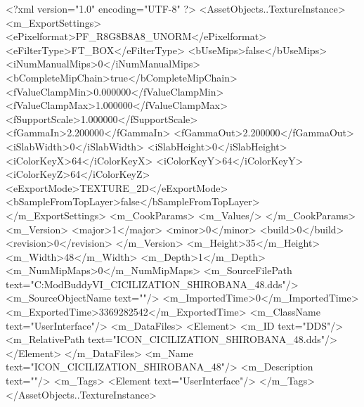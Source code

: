 <?xml version="1.0" encoding="UTF-8" ?>
<AssetObjects..TextureInstance>
	<m_ExportSettings>
		<ePixelformat>PF_R8G8B8A8_UNORM</ePixelformat>
		<eFilterType>FT_BOX</eFilterType>
		<bUseMips>false</bUseMips>
		<iNumManualMips>0</iNumManualMips>
		<bCompleteMipChain>true</bCompleteMipChain>
		<fValueClampMin>0.000000</fValueClampMin>
		<fValueClampMax>1.000000</fValueClampMax>
		<fSupportScale>1.000000</fSupportScale>
		<fGammaIn>2.200000</fGammaIn>
		<fGammaOut>2.200000</fGammaOut>
		<iSlabWidth>0</iSlabWidth>
		<iSlabHeight>0</iSlabHeight>
		<iColorKeyX>64</iColorKeyX>
		<iColorKeyY>64</iColorKeyY>
		<iColorKeyZ>64</iColorKeyZ>
		<eExportMode>TEXTURE_2D</eExportMode>
		<bSampleFromTopLayer>false</bSampleFromTopLayer>
	</m_ExportSettings>
	<m_CookParams>
		<m_Values/>
	</m_CookParams>
	<m_Version>
		<major>1</major>
		<minor>0</minor>
		<build>0</build>
		<revision>0</revision>
	</m_Version>
	<m_Height>35</m_Height>
	<m_Width>48</m_Width>
	<m_Depth>1</m_Depth>
	<m_NumMipMaps>0</m_NumMipMaps>
	<m_SourceFilePath text="C:\Users\asus\Documents\Firaxis ModBuddy\Civilization VI\temppic\ICON_CICILIZATION_SHIROBANA_48.dds"/>
	<m_SourceObjectName text=""/>
	<m_ImportedTime>0</m_ImportedTime>
	<m_ExportedTime>3369282542</m_ExportedTime>
	<m_ClassName text="UserInterface"/>
	<m_DataFiles>
		<Element>
			<m_ID text="DDS"/>
			<m_RelativePath text="ICON_CICILIZATION_SHIROBANA_48.dds"/>
		</Element>
	</m_DataFiles>
	<m_Name text="ICON_CICILIZATION_SHIROBANA_48"/>
	<m_Description text=""/>
	<m_Tags>
		<Element text="UserInterface"/>
	</m_Tags>
</AssetObjects..TextureInstance>

